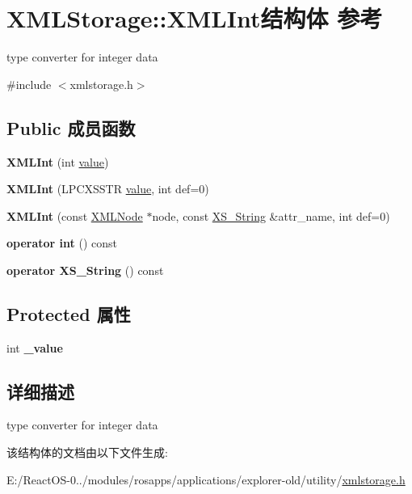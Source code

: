 \hypertarget{struct_x_m_l_storage_1_1_x_m_l_int}{}\section{X\+M\+L\+Storage\+:\+:X\+M\+L\+Int结构体 参考}
\label{struct_x_m_l_storage_1_1_x_m_l_int}


type converter for integer data  




{\ttfamily \#include $<$xmlstorage.\+h$>$}

\subsection*{Public 成员函数}
\begin{DoxyCompactItemize}
\item 
\mbox{\label{struct_x_m_l_storage_1_1_x_m_l_int_aff362fc8eec7aec8c104b9bdf747a7ec}} 
{\bfseries X\+M\+L\+Int} (int \hyperlink{unionvalue}{value})
\item 
\mbox{\label{struct_x_m_l_storage_1_1_x_m_l_int_ad48492cb49c4fcd18fa98a4ad88022c5}} 
{\bfseries X\+M\+L\+Int} (L\+P\+C\+X\+S\+S\+TR \hyperlink{unionvalue}{value}, int def=0)
\item 
\mbox{\label{struct_x_m_l_storage_1_1_x_m_l_int_af02eaf4d43d24aded717930c7af8ca49}} 
{\bfseries X\+M\+L\+Int} (const \hyperlink{struct_x_m_l_storage_1_1_x_m_l_node}{X\+M\+L\+Node} $\ast$node, const \hyperlink{struct_x_m_l_storage_1_1_x_s___string}{X\+S\+\_\+\+String} \&attr\+\_\+name, int def=0)
\item 
\mbox{\label{struct_x_m_l_storage_1_1_x_m_l_int_a793abcc8f07f5472b2bf232f61e8fb2b}} 
{\bfseries operator int} () const
\item 
\mbox{\label{struct_x_m_l_storage_1_1_x_m_l_int_ae2e08c79951e876e98d2b0ff0c48eac9}} 
{\bfseries operator X\+S\+\_\+\+String} () const
\end{DoxyCompactItemize}
\subsection*{Protected 属性}
\begin{DoxyCompactItemize}
\item 
\mbox{\label{struct_x_m_l_storage_1_1_x_m_l_int_a347d6c6cce6f662ee05af110823ebefe}} 
int {\bfseries \+\_\+value}
\end{DoxyCompactItemize}


\subsection{详细描述}
type converter for integer data 

该结构体的文档由以下文件生成\+:\begin{DoxyCompactItemize}
\item 
E\+:/\+React\+O\+S-\/0../modules/rosapps/applications/explorer-\/old/utility/\hyperlink{xmlstorage_8h}{xmlstorage.\+h}\end{DoxyCompactItemize}
